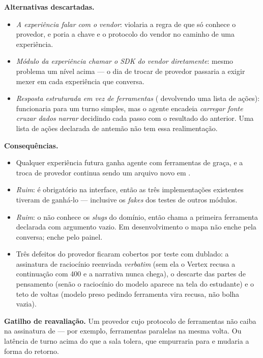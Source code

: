 \textbf{Alternativas descartadas.}
\begin{itemize}
  \item \emph{A experiência falar com o vendor}: violaria a regra de que só
     conhece o provedor, e poria a chave e o protocolo do vendor no
    caminho de uma experiência.
  \item \emph{Módulo da experiência chamar o SDK do vendor diretamente}: mesmo
    problema um nível acima --- o dia de trocar de provedor passaria a exigir
    mexer em cada experiência que conversa.
  \item \emph{Resposta estruturada em vez de ferramentas} (
    devolvendo uma lista de ações): funcionaria para um turno simples, mas o
    agente encadeia \emph{carregar fonte} \seta{} \emph{cruzar dados} \seta{}
    \emph{narrar} decidindo cada passo com o resultado do anterior. Uma lista de
    ações declarada de antemão não tem essa realimentação.
\end{itemize}

\textbf{Consequências.}
\begin{itemize}
  \item Qualquer experiência futura ganha agente com ferramentas de graça, e a
    troca de provedor continua sendo um arquivo novo em .
  \item \emph{Ruim}:  é obrigatório na interface, então as três
    implementações existentes tiveram de ganhá-lo --- inclusive os \emph{fakes}
    dos testes de outros módulos.
  \item \emph{Ruim}: o  não conhece os \emph{slugs} do domínio,
    então chama a primeira ferramenta declarada com argumento vazio. Em
    desenvolvimento o mapa não enche pela conversa; enche pelo painel.
  \item Três defeitos do provedor ficaram cobertos por teste com 
    dublado: a assinatura de raciocínio reenviada \emph{verbatim} (sem ela o
    Vertex recusa a continuação com 400 e a narrativa nunca chega), o descarte
    das partes de pensamento (senão o raciocínio do modelo aparece na tela do
    estudante) e o teto de voltas (modelo preso pedindo ferramenta vira recusa, não
    bolha vazia).
\end{itemize}

\textbf{Gatilho de reavaliação.} Um provedor cujo protocolo de ferramentas não
caiba na assinatura de  --- por exemplo, ferramentas paralelas na
mesma volta. Ou latência de turno acima do que a sala tolera, que empurraria para
 e mudaria a forma do retorno.

